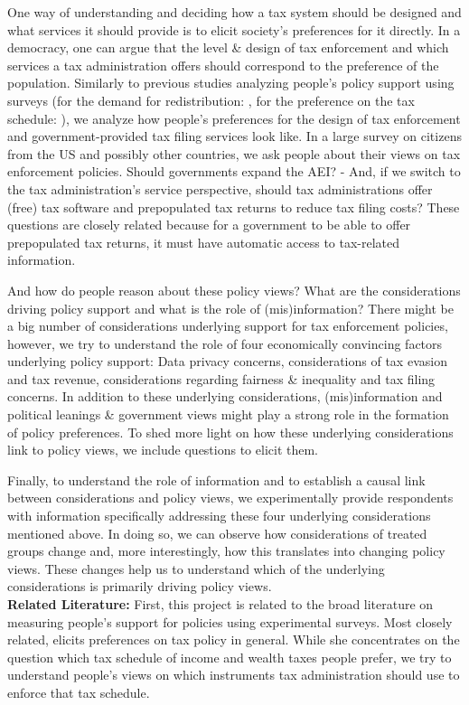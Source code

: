 \documentclass[11pt]{article}
\begin{document}
One way of understanding and deciding how a tax system should be designed and what services it should provide is to elicit society's preferences for it directly. In a democracy, one can argue that the level \& design of tax enforcement and which services a tax administration offers should correspond to the preference of the population. Similarly to previous studies analyzing people's policy support using surveys (for the demand for redistribution: \textcite{kuziemko2015elastic},  for the preference on the tax schedule: \textcite{stantcheva2021understanding}), we analyze how people's preferences for the design of tax enforcement and government-provided tax filing services look like. In a large survey on citizens from the US and possibly other countries, we ask people about their views on tax enforcement policies. Should governments expand the AEI? - And, if we switch to the tax administration's service perspective, should tax administrations offer (free) tax software and prepopulated tax returns to reduce tax filing costs? These questions are closely related because for a government to be able to offer prepopulated tax returns, it must have automatic access to tax-related information.

And how do people reason about these policy views? What are the considerations driving policy support and what is the role of (mis)information? There might be a big number of considerations underlying support for tax enforcement policies, however, we try to understand the role of four economically convincing factors underlying policy support: Data privacy concerns, considerations of tax evasion and tax revenue, considerations regarding fairness \& inequality and tax filing concerns. In addition to these underlying considerations, (mis)information and political leanings \& government views might play a strong role in the formation of policy preferences. To shed more light on how these underlying considerations link to policy views, we include questions to elicit them. 

Finally, to understand the role of information and to establish a causal link between considerations and policy views, we experimentally provide respondents with information specifically addressing these four underlying considerations mentioned above. In doing so, we can observe how considerations of treated groups change and, more interestingly, how this translates into changing policy views. These changes help us to understand which of the underlying considerations is primarily driving policy views. \\[0.5em]
\textbf{Related Literature:} First, this project is related to the broad literature on measuring people's support for policies using experimental surveys. Most closely related, \textcite{stantcheva2021understanding} elicits preferences on tax policy in general. While she concentrates on the question which tax schedule of income and wealth taxes people prefer, we try to understand people's views on which instruments tax administration should use to enforce that tax schedule. 
\end{document}
